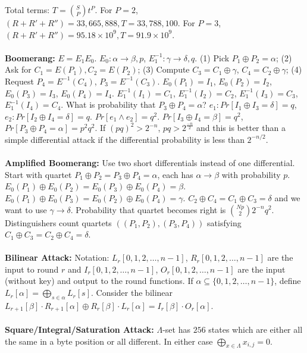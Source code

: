 Total terms: $T= {S \choose P} t^P$.  
For $P=2$, $(R+R'+R'')= 33,665,888, T= 33,788,100$.
For $P=3$, $(R+R'+R'')= 95.18 \times 10^9, T= 91.9 \times 10^9$.
\\
\\
{\bf Boomerang:} $E=E_1 E_0$.
$E_0: \alpha \rightarrow \beta, p$,
$E_1^{-1}: \gamma \rightarrow \delta, q$.  (1) Pick $P_1 \oplus P_2= \alpha$;
(2) Ask for $C_1= E(P_1), C_2= E(P_2)$;
(3) Compute $C_3= C_1 \oplus \gamma$, $C_4= C_2 \oplus \gamma$;
(4) Request $P_4= E^{-1}(C_4)$, $P_3= E^{-1}(C_3)$.
$E_0(P_1)=I_1$, $E_0(P_2)=I_2$, $E_0(P_3)=I_3$, $E_0(P_4)=I_4$.  $E_1^{-1}(I_1)= C_1$,
$E_1^{-1}(I_2)=C_2$, $E_1^{-1}(I_3)=C_3$, $E_1^{-1}(I_4)=C_4$.
What is probability that $P_3 \oplus P_4 = \alpha$?
$e_1: Pr[I_1 \oplus I_3 = \delta]= q$, $e_2: Pr[I_2 \oplus I_4= \delta]= q$.  
$Pr[ e_1 \wedge e_2 ]= q^2$.
$Pr[I_3 \oplus I_4 = \beta]= q^2$,
$Pr[P_3 \oplus P_4 = \alpha]= p^2q^2$.  If $(pq)^2>2^{-n}$, $pq>2^{\frac {-n} 2}$
and this is better than a simple differential attack if the differential probability
is less than $2^{-n/2}$.
\\
\\
{\bf Amplified Boomerang:}
Use two short differentials instead of one differential.  Start with quartet
$P_1 \oplus P_2 = P_3 \oplus P_4= \alpha$, 
each has $\alpha \rightarrow \beta$
with probability $p$.
$E_0(P_1) \oplus E_0(P_2) = E_0(P_3) \oplus E_0(P_4)= \beta$. 
$E_0(P_1) \oplus E_0(P_3) = E_0(P_2) \oplus E_0(P_4)= \gamma$. 
$C_2 \oplus C_4 = C_1 \oplus C_3= \delta$ and we want to use
$\gamma \rightarrow \delta$.  Probability that quartet becomes
right is ${{Np} \choose 2} 2^{-n} q^2$.  Distinguishers count quartets
$((P_1, P_2), (P_3, P_4))$ satisfying 
$C_1 \oplus C_3 = C_2 \oplus C_4 = \delta$.
\\
\\
{\bf Bilinear Attack:}
Notation: $L_r[0, 1, 2, \ldots, n-1]$, $R_r[0, 1, 2, \ldots, n-1]$ are the input
to round $r$ and 
$I_r[0, 1, 2, \ldots, n-1]$, $O_r[0, 1, 2, \ldots, n-1]$ are the input (without key)
and output to the round functions.  If $\alpha \subseteq \{0, 1, 2, \ldots, n-1\}$,
define $L_r[\alpha]= \bigoplus_{s \in \alpha} L_r[s]$.  Consider the bilinear
$L_{r+1}[\beta] \cdot R_{r+1}[\alpha] \oplus
R_{r}[\beta] \cdot L_{r}[\alpha] = I_{r}[\beta] \cdot O_{r}[\alpha]$.
\\
\\
{\bf Square/Integral/Saturation Attack:} 
$\Lambda$-set has $256$ states which are either all the same in a byte position or
all different.  In either case $\bigoplus_{x \in \Lambda} x_{i,j} = 0$.  
